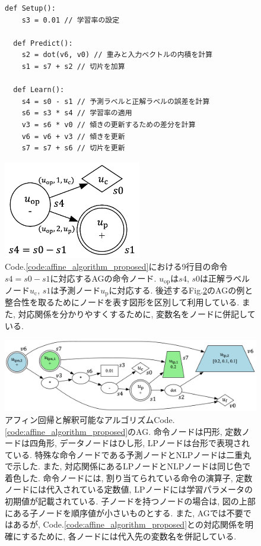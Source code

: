 \documentclass[11pt,oneside,openany,report]{jsbook}
\begin{document}
\begin{figure}[t]
\begin{lstlisting}[caption=アフィン回帰と解釈可能なアルゴリズム (Code.\ref{code:affine_algorithm}と同様),label=code:affine_algorithm_proposed]
  def Setup():
    s3 = 0.01 // 学習率の設定

  def Predict():
    s2 = dot(v6, v0) // 重みと入力ベクトルの内積を計算
    s1 = s7 + s2 // 切片を加算

  def Learn():
    s4 = s0 - s1 // 予測ラベルと正解ラベルの誤差を計算
    s6 = s3 * s4 // 学習率の適用
    v3 = s6 * v0 // 傾きの更新するための差分を計算
    v6 = v6 + v3 // 傾きを更新
    s7 = s7 + s6 // 切片を更新
\end{lstlisting}
\end{figure}

\begin{figure}
  \centering
  \includegraphics[width=6cm]{mgg_automl_zero_vag/ag/op_node.png}
  \caption{Code.\ref{code:affine_algorithm_proposed}における9行目の命令$s4 = s0 - s1$に対応するAGの命令ノード. $u_\mathrm{op}$は$s4$, $s0$は正解ラベルノード$u_\mathrm{c}$, $s1$は予測ノード$u_\mathrm{p}$に対応する. 後述するFig.\ref{fig:mgg_automl_zero_vag:affine}のAGの例と整合性を取るためにノードを表す図形を区別して利用している. また, 対応関係を分かりやすくするために, 変数名をノードに併記している. }
  \label{fig:mgg_automl_zero_vag:op_node}
\end{figure}

\begin{figure}
  \centering
  \includegraphics[width=14cm]{mgg_automl_zero_vag/ag/affine.png}
  \caption{アフィン回帰と解釈可能なアルゴリズムCode.\ref{code:affine_algorithm_proposed}のAG.  命令ノードは円形, 定数ノードは四角形, データノードはひし形, LPノードは台形で表現されている. 特殊な命令ノードである予測ノードとNLPノードは二重丸で示した. また, 対応関係にあるLPノードとNLPノードは同じ色で着色した. 命令ノードには, 割り当てられている命令の演算子, 定数ノードには代入されている定数値, LPノードには学習パラメータの初期値が記載されている. 子ノードを持つノードの場合は, 図の上部にある子ノードを順序値が小さいものとする. また, AGでは不要ではあるが, Code.\ref{code:affine_algorithm_proposed}との対応関係を明確にするために, 各ノードには代入先の変数名を併記している. }
  \label{fig:mgg_automl_zero_vag:affine}
\end{figure}
\end{document}
